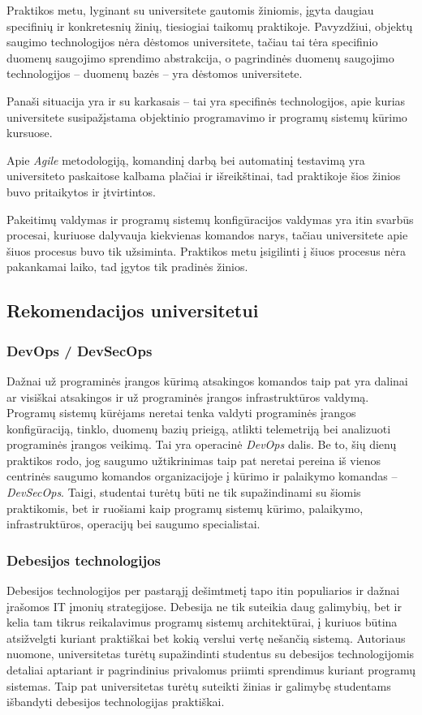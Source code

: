 Praktikos metu, lyginant su universitete gautomis žiniomis, įgyta daugiau specifinių ir konkretesnių žinių, tiesiogiai taikomų praktikoje. Pavyzdžiui, objektų saugimo technologijos nėra dėstomos universitete, tačiau tai tėra specifinio duomenų saugojimo sprendimo abstrakcija, o pagrindinės duomenų saugojimo technologijos -- duomenų bazės -- yra dėstomos universitete.

Panaši situacija yra ir su karkasais -- tai yra specifinės technologijos, apie kurias universitete susipažįstama objektinio programavimo ir programų sistemų kūrimo kursuose.

Apie \textit{Agile} metodologiją, komandinį darbą bei automatinį testavimą yra universiteto paskaitose kalbama plačiai ir išreikštinai, tad praktikoje šios žinios buvo pritaikytos ir įtvirtintos. 

Pakeitimų valdymas ir programų sistemų konfigūracijos valdymas yra itin svarbūs procesai, kuriuose dalyvauja kiekvienas komandos narys, tačiau universitete apie šiuos procesus buvo tik užsiminta. Praktikos metu įsigilinti į šiuos procesus nėra pakankamai laiko, tad įgytos tik pradinės žinios.

\subsection{Rekomendacijos universitetui}

\subsubsection*{DevOps / DevSecOps}

Dažnai už programinės įrangos kūrimą atsakingos komandos taip pat yra dalinai ar visiškai atsakingos ir už programinės įrangos infrastruktūros valdymą. Programų sistemų kūrėjams neretai tenka valdyti programinės įrangos konfigūraciją, tinklo, duomenų bazių prieigą, atlikti telemetriją bei analizuoti programinės įrangos veikimą. Tai yra operacinė \textit{DevOps} dalis. Be to, šių dienų praktikos rodo, jog saugumo užtikrinimas taip pat neretai pereina iš vienos centrinės saugumo komandos organizacijoje į kūrimo ir palaikymo komandas -- \textit{DevSecOps}. Taigi, studentai turėtų būti ne tik supažindinami su šiomis praktikomis, bet ir ruošiami kaip programų sistemų kūrimo, palaikymo, infrastruktūros, operacijų bei saugumo specialistai. 

\subsubsection*{Debesijos technologijos}

Debesijos  technologijos per pastarąjį dešimtmetį tapo itin populiarios ir dažnai įrašomos IT įmonių strategijose. Debesija ne tik suteikia daug galimybių, bet ir kelia tam tikrus reikalavimus programų sistemų architektūrai, į kuriuos būtina atsižvelgti kuriant praktiškai bet kokią verslui vertę nešančią sistemą. Autoriaus nuomone, universitetas turėtų supažindinti studentus su debesijos technologijomis detaliai aptariant ir pagrindinius privalomus priimti sprendimus kuriant programų sistemas. Taip pat universitetas turėtų suteikti žinias ir galimybę studentams išbandyti debesijos technologijas praktiškai.